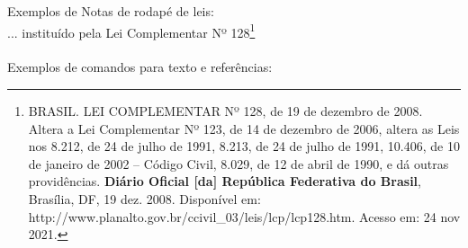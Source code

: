 Exemplos de Notas de rodapé de leis: \\

... instituído pela Lei Complementar Nº 128\footnote{BRASIL. LEI COMPLEMENTAR Nº 128, de 19 de dezembro de 2008. Altera a Lei Complementar Nº 123, de 14 de dezembro de 2006, altera as Leis nos 8.212, de 24 de julho de 1991, 8.213, de 24 de julho de 1991, 10.406, de 10 de janeiro de 2002 – Código Civil, 8.029, de 12 de abril de 1990, e dá outras providências. \textbf{Diário Oficial [da] República Federativa do Brasil}, Brasília, DF, 19 dez. 2008. Disponível em: http://www.planalto.gov.br/ccivil\_03/leis/lcp/lcp128.htm. Acesso em: 24 nov 2021.}
\\
\\

Exemplos de comandos para texto e referências:

